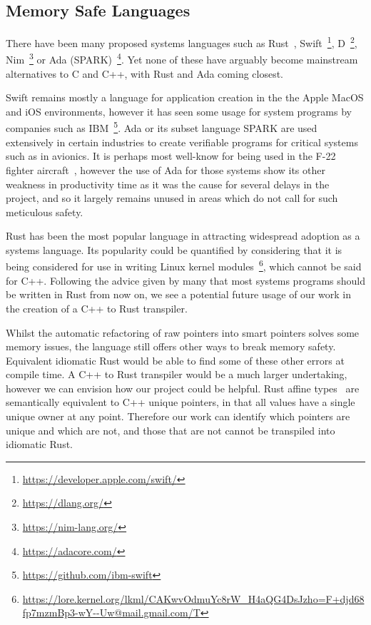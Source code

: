 \documentclass{proposal}
\begin{document}
    \subsection{Memory Safe Languages}\label{subsec:rust}

    There have been many proposed systems languages such as Rust~\cite{Balasubramanian2017}, Swift~\footnote{\url{https://developer.apple.com/swift/}}, D~\footnote{\url{https://dlang.org/}}, Nim~\footnote{\url{https://nim-lang.org/}} or Ada (SPARK)~\footnote{\url{https://adacore.com/}}.
    Yet none of these have arguably become mainstream alternatives to C and C++, with Rust and Ada coming closest.

    Swift remains mostly a language for application creation in the the Apple MacOS and iOS environments, however it has seen some usage for system programs by companies such as IBM~\footnote{\url{https://github.com/ibm-swift}}.
    Ada or its subset language SPARK are used extensively in certain industries to create verifiable programs for critical systems such as in avionics.
    It is perhaps most well-know for being used in the F-22 fighter aircraft~\cite{Malas1997}, however the use of Ada for those systems show its other weakness in productivity time as it was the cause for several delays in the project, and so it largely remains unused in areas which do not call for such meticulous safety.

    Rust has been the most popular language in attracting widespread adoption as a systems language.
    Its popularity could be quantified by considering that it is being considered for use in writing Linux kernel modules~\footnote{\url{https://lore.kernel.org/lkml/CAKwvOdmuYc8rW_H4aQG4DsJzho=F+djd68fp7mzmBp3-wY--Uw@mail.gmail.com/T}}, which cannot be said for C++.
    Following the advice given by many that most systems programs should be written in Rust from now on, we see a potential future usage of our work in the creation of a C++ to Rust transpiler.

    Whilst the automatic refactoring of raw pointers into smart pointers solves some memory issues, the language still offers other ways to break memory safety.
    Equivalent idiomatic Rust would be able to find some of these other errors at compile time.
    A C++ to Rust transpiler would be a much larger undertaking, however we can envision how our project could be helpful.
    Rust affine types~\cite{Balasubramanian2017} are semantically equivalent to C++ unique pointers, in that all values have a single unique owner at any point.
    Therefore our work can identify which pointers are unique and which are not, and those that are not cannot be transpiled into idiomatic Rust.
\end{document}
